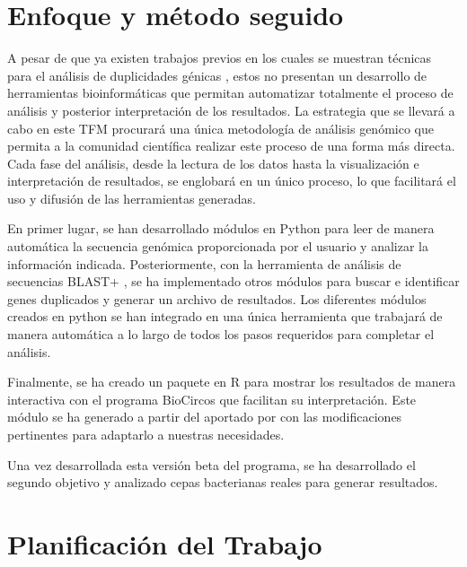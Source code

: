\section{Enfoque y método seguido}
A pesar de que ya existen trabajos previos en los cuales se muestran técnicas para el análisis de duplicidades génicas \cite{bernabeu_gene_2019, sanchez-herrero_gene_2020}, estos no presentan un desarrollo de herramientas bioinformáticas que permitan automatizar totalmente el proceso de análisis y posterior interpretación de los resultados. La estrategia que se llevará a cabo en este TFM procurará una única metodología de análisis genómico que permita a la comunidad científica realizar este proceso de una forma más directa. Cada fase del análisis, desde la lectura de los datos hasta la visualización e interpretación de resultados, se englobará en un único proceso, lo que facilitará el uso y difusión de las herramientas generadas.

En primer lugar, se han desarrollado módulos en Python \cite{Rossum_2009} para leer de manera automática la secuencia genómica proporcionada por el usuario y analizar la información indicada. Posteriormente, con la herramienta de análisis de secuencias BLAST+ \cite{madden_blast_2003}, se ha implementado otros módulos para buscar e identificar genes duplicados y generar un archivo de resultados. Los diferentes módulos creados en python se han integrado en una única herramienta que trabajará de manera automática a lo largo de todos los pasos requeridos para completar el análisis.

Finalmente, se ha creado un paquete en R \cite{R_core} para mostrar los resultados de manera interactiva con el programa BioCircos \cite{biocircos} que facilitan su interpretación. Este módulo se ha generado a partir del aportado por \cite{sanchez-herrero_gene_2020} con las modificaciones pertinentes para adaptarlo a nuestras necesidades.

Una vez desarrollada esta versión beta del programa, se ha desarrollado el segundo objetivo y analizado cepas bacterianas reales para generar resultados.


\section{Planificación del Trabajo}


